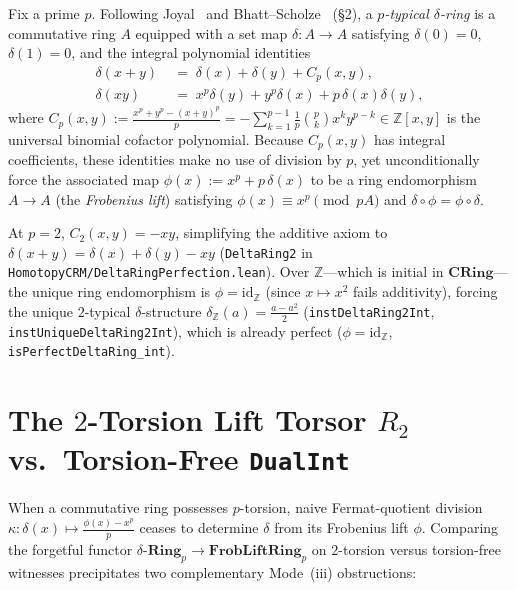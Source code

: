 \documentclass[10pt,twoside,openright]{book}
\theoremstyle{crmplain}
\theoremstyle{crmdef}
\theoremstyle{crmremark}
\begin{document}
Fix a prime $p$. Following Joyal~\cite{Joyal85} and Bhatt--Scholze~\cite{BhattScholze22} (\S2), a \emph{$p$-typical $\delta$-ring} is a commutative ring $A$ equipped with a set map $\delta : A \to A$ satisfying $\delta(0) = 0$, $\delta(1) = 0$, and the integral polynomial identities
\[
  \begin{aligned}
    \delta(x + y) &\;=\; \delta(x) + \delta(y) + C_p(x, y), \\
    \delta(xy) &\;=\; x^p\delta(y) + y^p\delta(x) + p\,\delta(x)\delta(y),
  \end{aligned}
\]
where $C_p(x, y) := \frac{x^p + y^p - (x+y)^p}{p} = -\sum_{k=1}^{p-1} \frac{1}{p}\binom{p}{k} x^k y^{p-k} \in \mathbb{Z}[x, y]$ is the universal binomial cofactor polynomial. Because $C_p(x, y)$ has integral coefficients, these identities make no use of division by $p$, yet unconditionally force the associated map $\phi(x) := x^p + p\,\delta(x)$ to be a ring endomorphism $A \to A$ (the \emph{Frobenius lift}) satisfying $\phi(x) \equiv x^p \pmod{pA}$ and $\delta \circ \phi = \phi \circ \delta$.

At $p = 2$, $C_2(x, y) = -xy$, simplifying the additive axiom to $\delta(x + y) = \delta(x) + \delta(y) - xy$ (\texttt{DeltaRing2} in \texttt{HomotopyCRM/\allowbreak DeltaRing\allowbreak Perfection.lean}). Over $\mathbb{Z}$---which is initial in $\mathbf{CRing}$---the unique ring endomorphism is $\phi = \mathrm{id}_{\mathbb{Z}}$ (since $x \mapsto x^2$ fails additivity), forcing the unique $2$-typical $\delta$-structure $\delta_{\mathbb{Z}}(a) = \frac{a - a^2}{2}$ (\texttt{instDeltaRing2Int}, \texttt{instUniqueDeltaRing2Int}), which is already perfect ($\phi = \mathrm{id}_{\mathbb{Z}}$, \texttt{isPerfectDeltaRing\_int}).

\section{\texorpdfstring{The $2$-Torsion Lift Torsor $R_2$ vs.\ Torsion-Free \texttt{DualInt}}{The 2-Torsion Lift Torsor R2 vs. Torsion-Free DualInt}}\label{sec:r2-vs-dualint}

When a commutative ring possesses $p$-torsion, naive Fermat-quotient division $\kappa : \delta(x) \mapsto \frac{\phi(x) - x^p}{p}$ ceases to determine $\delta$ from its Frobenius lift $\phi$. Comparing the forgetful functor $\delta\text{-}\mathbf{Ring}_p \to \mathbf{FrobLiftRing}_p$ on $2$-torsion versus torsion-free witnesses precipitates two complementary Mode~(iii) obstructions:
\end{document}
